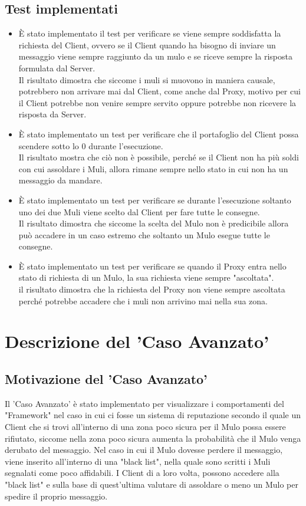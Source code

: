 \documentclass[13pt,a4paper]{article}
\begin{document}
	\subsection{Test implementati}
	\begin{itemize}
		\item È stato implementato il test per verificare se viene sempre soddisfatta la richiesta del Client, ovvero se il Client quando ha bisogno di inviare un messaggio viene sempre raggiunto da un mulo e se riceve sempre la risposta formulata dal Server.\\
		Il risultato dimostra che siccome i muli si muovono in maniera causale, potrebbero non arrivare mai dal Client, come anche dal Proxy, motivo per cui il Client potrebbe non venire sempre servito oppure potrebbe non ricevere la risposta da Server.
		\item È stato implementato un test per verificare che il portafoglio del Client possa scendere sotto lo 0 durante l'esecuzione.\\
		Il risultato mostra che ciò non è possibile, perché se il Client non ha più soldi con cui assoldare i Muli, allora rimane sempre nello stato in cui non ha un messaggio da mandare.
		\item È stato implementato un test per verificare se durante l'esecuzione soltanto uno dei due Muli viene  scelto dal Client per fare tutte le consegne.\\
		Il risultato dimostra che siccome la scelta del Mulo non è predicibile allora può accadere in un caso estremo che soltanto un Mulo esegue tutte le consegne.
		\item È stato implementato un test per verificare se quando il Proxy entra nello stato di richiesta di un Mulo, la sua richiesta viene sempre "ascoltata".\\
		il risultato dimostra che la richiesta del Proxy non viene sempre ascoltata perché potrebbe accadere che i muli non arrivino mai nella sua zona.
\end{itemize}

\section{Descrizione del 'Caso Avanzato'}
\subsection{Motivazione del 'Caso  Avanzato'} 
Il 'Caso Avanzato' è stato implementato per visualizzare i comportamenti del "Framework" nel caso in cui ci fosse un sistema di reputazione secondo il quale un Client che si trovi all'interno di una zona poco sicura per il Mulo possa essere rifiutato, siccome nella zona poco sicura aumenta la probabilità che il Mulo venga derubato del messaggio. Nel caso in cui il Mulo dovesse perdere il messaggio, viene inserito all'interno di una "black list", nella quale sono scritti i Muli segnalati come poco affidabili. I Client di a loro volta,  possono accedere alla "black list" e sulla base di quest'ultima valutare di assoldare o meno un Mulo per spedire il proprio messaggio.
\end{document}
